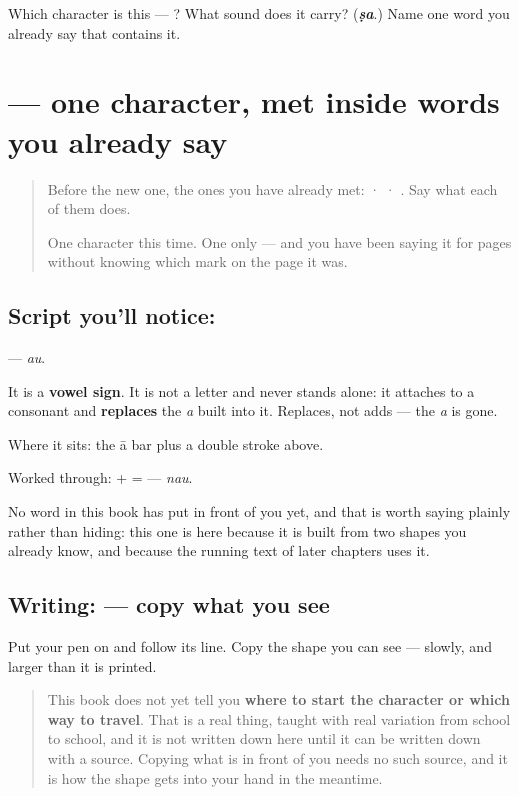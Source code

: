 \begin{tcolorbox}[breakable,colback=teal!4,colframe=teal!35!black,title={Before you move on}]
Which character is this — ? What sound does it carry? (\emph{\textbf{ṣa}}.) Name one word you already say that contains it.
\end{tcolorbox}
\section[\texorpdfstring{\sk{ौ} (au)}{ौ (au)}]{ — one character, met inside words you already say}

\label{lesson:SA-S115-vowel-sign-au}



\begin{quote}
Before the new one, the ones you have already met:  ·  · . Say what each of them does.

One character this time. One only — and you have been saying it for pages without knowing which mark on the page it was.
\end{quote}

\subsection*{Script you'll notice: }
\textbf{} — \emph{au}.

It is a \textbf{vowel sign}. It is not a letter and never stands alone: it attaches to a consonant and \textbf{replaces} the \emph{a} built into it. Replaces, not adds — the \emph{a} is gone.

Where it sits: the ā bar plus a double stroke above.

Worked through: \textbf{} + \textbf{} = \textbf{} — \emph{nau}.

No word in this book has put  in front of you yet, and that is worth saying plainly rather than hiding: this one is here because it is built from two shapes you already know, and because the running text of later chapters uses it.

\subsection*{Writing:  — copy what you see}
Put your pen on  and follow its line. Copy the shape you can see — slowly, and larger than it is printed.

\begin{quote}
This book does not yet tell you \textbf{where to start the character or which way to travel}. That is a real thing, taught with real variation from school to school, and it is not written down here until it can be written down with a source. Copying what is in front of you needs no such source, and it is how the shape gets into your hand in the meantime.
\end{quote}

